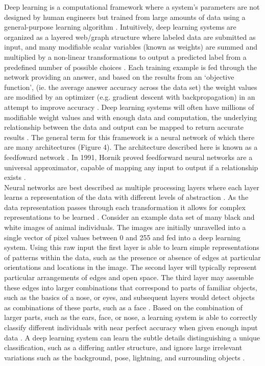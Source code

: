 \documentclass[11pt]{article}
\begin{document}
\noindent
Deep learning is a computational framework where a system's parameters are not designed by human engineers but trained from large amounts of data using a general-purpose learning algorithm \cite{lecun2015deep}. Intuitively, deep learning systems are organized as a layered web/graph structure where labeled data are submitted as input, and many modifiable scalar variables (known as weights) are summed and multiplied by a non-linear transformations to output a predicted label from a predefined number of possible choices \cite{goodfellow2016deep}. Each training example is fed through the network providing an answer, and based on the results from an `objective function', (ie. the average answer accuracy across the data set) the weight values are modified by an optimizer (e.g. gradient descent with backpropagation) in an attempt to improve accuracy \cite{goodfellow2016deep}. Deep learning systems will often have millions of modifiable weight values and with enough data and computation, the underlying relationship between the data and output can be mapped to return accurate results \cite{krizhevsky2012imagenet, simonyan2014very, szegedy2015going, he2016deep}. The general term for this framework is a neural network of which there are many architectures (Figure 4). The architecture described here is known as a feedfoward network \cite{lecun2015deep}. In 1991, Hornik proved feedforward neural networks are a universal approximator, capable of mapping any input to output if a relationship exists \cite{hornik1991approximation}.
\newline
\\
Neural networks are best described as multiple processing layers where each layer learns a representation of the data with different levels of abstraction \cite{lecun2015deep}. As the data representation passes through each transformation it allows for complex representations to be learned \cite{lecun2015deep}. Consider an example data set of many black and white images of animal individuals. The images are initially unravelled into a single vector of pixel values between 0 and 255 and fed into a deep learning system. Using this raw input the first layer is able to learn simple representations of patterns within the data, such as the presence or absence of edges at particular orientations and locations in the image. The second layer will typically represent particular arrangements of edges and open space. The third layer may assemble these edges into larger combinations that correspond to parts of familiar objects, such as the basics of a nose, or eyes, and subsequent layers would detect objects as combinations of these parts, such as a face \cite{lecun2015deep}. Based on the combination of larger parts, such as the ears, face, or nose, a learning system is able to correctly classify different individuals with near perfect accuracy when given enough input data \cite{swanson2015snapshot}. A deep learning system can learn the subtle details distinguishing a unique classification, such as a differing antler structure, and ignore large irrelevant variations such as the background, pose, lightning, and surrounding objects \cite{krizhevsky2012imagenet}.
\end{document}
